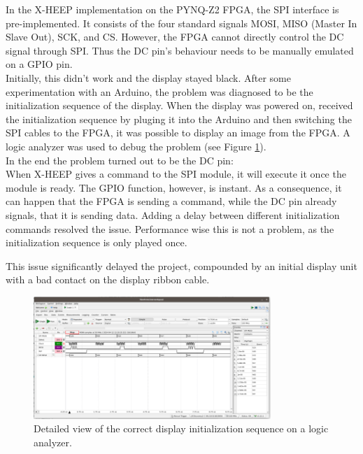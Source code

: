 In the X-HEEP implementation on the PYNQ-Z2 FPGA, the SPI interface is pre-implemented. It consists of the four standard signals MOSI, MISO (Master In Slave Out), SCK, and CS.  However, the FPGA cannot directly control the DC signal through SPI. Thus the DC pin's behaviour needs to be manually emulated on a GPIO pin. \\
Initially, this didn't work and the display stayed black. After some experimentation with an Arduino, the problem was diagnosed to be the initialization sequence of the display. When the display was powered on, received the initialization sequence by pluging it into the Arduino and then switching the SPI cables to the FPGA, it was possible to display an image from the FPGA. A logic analyzer was used to debug the problem (see Figure \ref{fig:Logic_analyzer_zoom_in}). \\
In the end the problem turned out to be the DC pin: \\
When X-HEEP gives a command to the SPI module, it will execute it once the module is ready. The GPIO function, however, is instant. As a consequence, it can happen that the FPGA is sending a command, while the DC pin already signals, that it is sending data. Adding a delay between different initialization commands resolved the issue. Performance wise this is not a problem, as the initialization sequence is only played once.

This issue significantly delayed the project, compounded by an initial display unit with a bad contact on the display ribbon cable.

\begin{figure}[ht]
    \centering
    \includegraphics[width=0.8\textwidth]{images/Logic_analyzer_zoom_in.png}
    \caption{Detailed view of the correct display initialization sequence on a logic analyzer.} 
    \label{fig:Logic_analyzer_zoom_in}
\end{figure}

